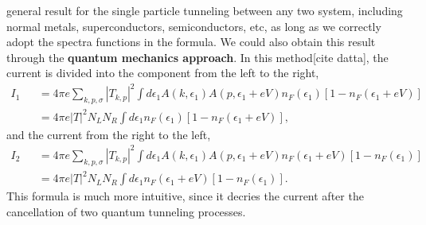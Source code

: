 \documentclass[11pt]{article}
\begin{document}
general result for the single particle tunneling between any two system,
including normal metals, superconductors, semiconductors, etc, as long
as we correctly adopt the spectra functions in the formula. We could
also obtain this result through the \textbf{quantum mechanics approach}.
In this method{[}cite datta{]}, the current is divided into the
component from the left to the right, \begin{eqnarray}
I_1 && = 4\pi e \sum_{k,p,\sigma}  |T_{k,p}|^2   \int d\epsilon_1 A(k,\epsilon_1 ) A(p,\epsilon_1+ eV ) n_F (\epsilon_1) \left[ 1- n_F(\epsilon_1 + eV) \right]
\nonumber \\ 
&& =  4\pi e  |T|^2  N_L N_R  \int d\epsilon_1 n_F (\epsilon_1) \left[ 1- n_F(\epsilon_1 + eV) \right],
\end{eqnarray} and the current from the right to the left,
\begin{eqnarray}
I_2 && =4\pi  e \sum_{k,p,\sigma}  |T_{k,p}|^2   \int d\epsilon_1 A(k,\epsilon_1 ) A(p,\epsilon_1+ eV ) n_F (\epsilon_1+eV) \left[ 1- n_F(\epsilon_1 ) \right]
\nonumber \\ 
&& =  4\pi e  |T|^2  N_L N_R  \int d\epsilon_1 n_F (\epsilon_1+eV) \left[ 1- n_F(\epsilon_1) \right].
\end{eqnarray} This formula is much more intuitive, since it decries the
current after the cancellation of two quantum tunneling processes.


    
    
    
    
\end{document}
